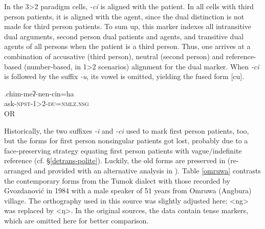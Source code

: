 In the 3>2 paradigm cells, \emph{-ci} is aligned with the patient. In all cells with third person patients, it is aligned with the agent, since the dual distinction is not made for third person patients. To sum up, this marker indexes all intransitive dual arguments,  second person dual patients and agents, and transitive dual agents of all persons when the patient is a third person. Thus, one arrives at a combination of accusative (third person), neutral (second person) and reference-based (number-based, in 1>2 scenarios) alignment for the dual marker. When \emph{-ci} is followed by the suffix \emph{-u}, its vowel is omitted, yielding the fused form [cu].

\exg.chim-meʔ-nen-cin=ha\\
ask{\scshape -npst-1>2-du=nmlz.nsg}\\
 OR\\

Historically, the two suffixes \emph{-i} and \emph{-ci} used to mark first person patients, too, but the forms for first person nonsingular patients got lost, probably due to a face-preserving strategy equating first person patients with vague/indefinite reference (cf. §\ref{detrans-polite}). Luckily, the old forms are preserved in \citet{Gvozdanovic1987How} (re-arranged and provided with an alternative analysis in \citet{Driem1994The-Yakkha}). Table \ref{omruwa} contrasts the contemporary forms from the Tumok dialect with those recorded by Gvozdanović in 1984 with a male speaker of 51 years from Omruwa (Angbura) village. The orthography used in this source was slightly adjusted here; <ng> was replaced  by <ŋ>.  In the original sources, the data contain tense markers, which are omitted here for better comparison. 


